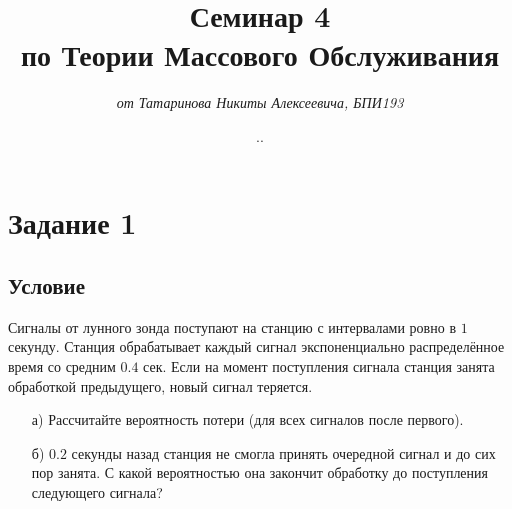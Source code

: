 \documentclass{article}
\title{\textbf{Семинар 4\\по Теории Массового Обслуживания}}
\author{\textit{от Татаринова Никиты Алексеевича, БПИ193}}
\date{\the\year .\twodigits{\the\month}.\twodigits{\the\day}}
\begin{document}
\maketitle
\section*{Задание 1}
\subsection*{Условие}
Сигналы от лунного зонда поступают на станцию с интервалами ровно в $ 1 $ секунду. Станция обрабатывает каждый сигнал экспоненциально распределённое время со средним $ 0.4 $ сек. Если на момент поступления сигнала станция занята обработкой предыдущего, новый сигнал теряется.
\begin{enumerate}
\item[а)] Рассчитайте вероятность потери (для всех сигналов после первого).
\item[б)] $ 0.2 $ секунды назад станция не смогла принять очередной сигнал и до сих пор занята. С какой вероятностью она закончит обработку до поступления следующего сигнала?
\end{enumerate}
\end{document}
